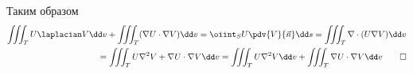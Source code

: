 Таким образом
\[
\begin{split}
  \iiint_{T} U \laplacian V \dd v
  + \iiint_{T} (\nabla U \cdot \nabla V) \dd v
  = \oiint_{S} U \pdv{V}{\vec{n}} \dd s
  = \iiint_{T} \nabla \cdot (U \nabla V) \dd v \\
  = \iiint_{T} U \nabla^2 V + \nabla U \cdot \nabla V \dd v
  = \iiint_{T} U \nabla^2 V \dd v + \iiint_{T} \nabla U \cdot \nabla V \dd v
  \qed
\end{split}
\]
